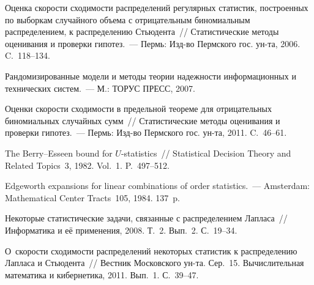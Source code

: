 \begin{multicols}{2}
{{\begin{thebibliography}{99}
 Оценка скорости
сходимости распределений регулярных статистик, построенных по
выборкам случайного объема с отрицательным биномиальным
распределением, к распределению Стьюдента~// Статистические методы
оценивания и проверки гипотез.~--- Пермь: Изд-во Пермского
гос. ун-та, 2006. C.~118--134.

Рандомизированные модели и методы теории надежности информационных и
технических сис\-тем.~--- М.: ТОРУС ПРЕСС, 2007.

 Оценки скорости сходимости в предельной теореме
для отрицательных биномиальных случайных сумм~// Статистические
методы оценивания и проверки гипотез.~--- Пермь: Изд-во Пермского
гос. ун-та, 2011. C.~46--61.

 The Berry--Esseen bound for
$U$-statistics~// Statistical Decision Theory and Related Topics~3,
1982. Vol.~1. P.~497--512.

 Edgeworth expansions for linear combinations of
order statistics.~--- Amsterdam: Mathematical Center Tracts~105,
1984. 137~p.

 Некоторые статистические задачи,
связанные с распределением Лапласа~// Информатика и её применения,
2008. Т.~2. Вып.~2. С.~19--34.

\label{end\stat}


 О~ско\-рости сходимости распределений некоторых
статистик к распределению Лапласа и Стьюдента~// Вестник Московского
ун-та. Сер.~15.  Вычислительная  математика и кибернетика,
2011. Вып.~1. С.~39--47.
\end{thebibliography}
}
}

\end{multicols}